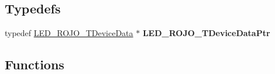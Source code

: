 \subsection*{Typedefs}
\begin{DoxyCompactItemize}
\item 
typedef \hyperlink{struct_l_e_d___r_o_j_o___t_device_data}{L\+E\+D\+\_\+\+R\+O\+J\+O\+\_\+\+T\+Device\+Data} $\ast$ {\bfseries L\+E\+D\+\_\+\+R\+O\+J\+O\+\_\+\+T\+Device\+Data\+Ptr}\hypertarget{group___l_e_d___r_o_j_o__module_ga072a187635c2a96e167c5aafd66af312}{}\label{group___l_e_d___r_o_j_o__module_ga072a187635c2a96e167c5aafd66af312}

\end{DoxyCompactItemize}
\subsection*{Functions}
